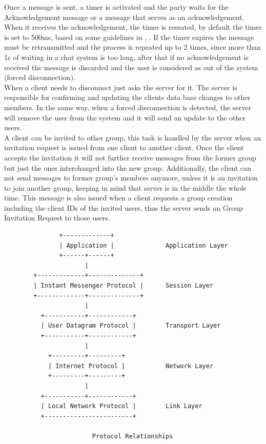 \documentclass{article}
\begin{document}
Once a message is sent, a timer is activated and the party waits for the Acknowledgement message or a message that serves as an acknowledgement. When it receives the acknowledgement, the timer is reseated, by default the timer is set to 500ms, based on some guidelines in \cite{1}, \cite{2}. If the timer expires the message must be retransmitted and the process is repeated up to 2 times, since more than 1s of waiting in a chat system is too long, after that if no acknowledgement is received the message is discarded and the user is considered as out of the system (forced disconnection).\\

When a client needs to disconnect just asks the server for it. The server is responsible for confirming and updating the clients data base changes to other members. In the same way, when a forced disconnection is detected, the server will remove the user from the system and it will send an update to the other users.\\

A client can be invited to other group, this task is handled by the server when an invitation request is issued from one client to another client. Once the client accepts the invitation it will not further receive messages from the former group but just the ones interchanged into the new group. Additionally, the client can not send messages to former group's members anymore, unless it is an invitation to join another group, keeping in mind that server is in the middle the whole time. This message is also issued when a client requests a group creation including the client IDs of the invited users, thus the server sends an Group Invitation Request to those users.\\


\begin{verbatim}
               +-------------+
               | Application |              Application Layer
               +------+------+
                      |
        +-------------+--------------+
        | Instant Messenger Protocol |      Session Layer
        +-------------+--------------+
                      |
          +-----------+------------+
          | User Datagram Protocol |        Transport Layer
          +-----------+------------+
                      |
            +---------+---------+
            | Internet Protocol |           Network Layer
            +---------+---------+
                      |
          +-----------+------------+
          | Local Network Protocol |        Link Layer
          +------------------------+
          
                        Protocol Relationships
\end{verbatim}
\end{document}
